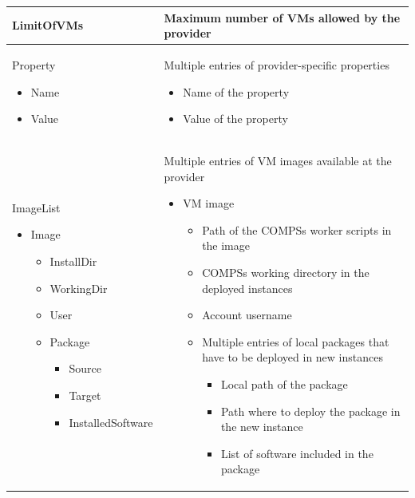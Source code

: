 \begin{longtable}{| p{} | p{} |}
  \hline
  LimitOfVMs	&	Maximum number of VMs allowed by the provider	\\
  
  \hline
  Property
  \begin{itemize}
    \item Name
    \item Value
  \end{itemize}
  &
  Multiple entries of provider-specific properties
  \begin{itemize}
    \item Name of the property
    \item Value of the property
  \end{itemize}
  \\
  \hline
  
  ImageList \newline
  \begin{itemize}
  \item Image
  \begin{itemize}
    \item InstallDir \newline
    \item WorkingDir \newline
    \item User
    \item Package \newline
    \begin{itemize}
    \item Source
    \item Target \newline
    \item InstalledSoftware
    \end{itemize}
  \end{itemize}
  \end{itemize}
  & 
  Multiple entries of VM images available at the provider
  \begin{itemize}
    \item VM image
    \begin{itemize}
      \item Path of the COMPSs worker scripts in the image
      \item COMPSs working directory in the deployed instances
      \item Account username
      \item Multiple entries of local packages that have to be deployed in new instances
      \begin{itemize}
	\item Local path of the package
	\item Path where to deploy the package in the new instance
	\item List of software included in the package
      \end{itemize}
    \end{itemize}
  \end{itemize}
  \\
  \hline
  

\end{longtable}
